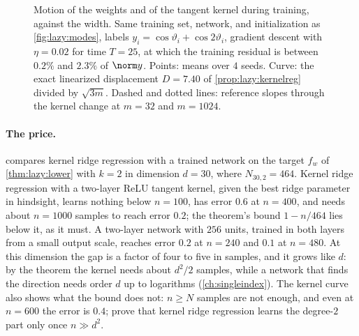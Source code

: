 \begin{refsection}
\begin{figure}[t]
\centering
{}
\caption{Motion of the weights and of the tangent kernel during training, against the width. Same training set, network, and initialization as \cref{fig:lazy:modes}, labels $y_i=\cos\vartheta_i+\cos2\vartheta_i$, gradient descent with $\eta=0.02$ for time $T=25$, at which the training residual is between $0.2\%$ and $2.3\%$ of $\norm y$. Points: means over $4$ seeds. Curve: the exact linearized displacement $D=7.40$ of \cref{prop:lazy:kernelreg} divided by $\sqrt{3m}$. Dashed and dotted lines: reference slopes through the kernel change at $m=32$ and $m=1024$.}
\label{fig:lazy:width}
\end{figure}

\paragraph{The price.}  compares kernel ridge regression with a trained network on the target $f_w$ of \cref{thm:lazy:lower} with $k=2$ in dimension $d=30$, where $N_{30,2}=464$. Kernel ridge regression with a two-layer ReLU tangent kernel, given the best ridge parameter in hindsight, learns nothing below $n=100$, has error $0.6$ at $n=400$, and needs about $n=1000$ samples to reach error $0.2$; the theorem's bound $1-n/464$ lies below it, as it must. A two-layer network with $256$ units, trained in both layers from a small output scale, reaches error $0.2$ at $n=240$ and $0.1$ at $n=480$. At this dimension the gap is a factor of four to five in samples, and it grows like $d$: by the theorem the kernel needs about $d^2/2$ samples, while a network that finds the direction needs order $d$ up to logarithms (\cref{ch:singleindex}). The kernel curve also shows what the bound does not: $n\ge N$ samples are not enough, and even at $n=600$ the error is $0.4$; \textcite{GhorbaniEtAl2021} prove that kernel ridge regression learns the degree-$2$ part only once $n\gg d^2$.


\end{refsection}
